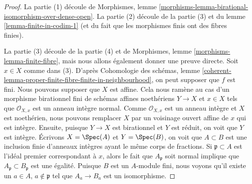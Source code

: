 \begin{proof}
La partie (1) découle de Morphismes, lemme
\ref{morphisms-lemma-birational-isomorphism-over-dense-open}. La
partie (2) découle de la partie (3) et du lemme
\ref{lemma-finite-in-codim-1} (et du fait que les morphismes finis ont des fibres finies).

\medskip\noindent
La partie (3) découle de la partie (4) et de Morphismes,
lemme \ref{morphisms-lemma-finite-fibre}, mais nous allons
également donner une preuve directe. Soit $x \in
X$ comme dans (3). D'après Cohomologie des schémas,
lemme
\ref{coherent-lemma-proper-finite-fibre-finite-in-neighbourhood},
on peut supposer que $f$ est fini. Nous pouvons supposer
que $X$ est affine. Cela nous ramène au cas d'un morphisme
birationnel fini de schémas affines noethériens $Y \to X$ et $x
\in X$ tels que $\mathcal{O}_{X, x}$ est un anneau intègre normal.
Comme $\mathcal{O}_{X, x}$ est un anneau intègre et $X$ est
noethérien, nous pouvons remplacer $X$ par un voisinage ouvert affine de
$x$ qui est intègre. Ensuite, puisque $Y \to X$ est birationnel
et $Y$ est réduit, on voit que $Y$ est intègre. Écrivons
$X = \Spec(A)$ et $Y = \Spec(B)$, on voit que $A \subset B$
est une inclusion finie d'anneaux intègres ayant le même corps de
fractions. Si $\mathfrak p \subset A$ est l'idéal premier correspondant
à $x$, alors le fait que $A_\mathfrak p$ soit normal implique que
$A_\mathfrak p \subset B_\mathfrak p$ est une égalité. Puisque $B$
est un $A$-module fini, nous voyons qu'il existe un $a \in A$, $a
\not \in \mathfrak p$ tel que $A_a \to B_a$ est un isomorphisme.


\end{proof}
